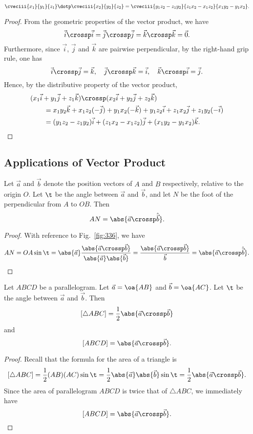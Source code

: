 \begin{proposition}
    \[\cveciii{x_1}{y_1}{z_1} \dotp \cveciii{x_2}{y_2}{z_2} = \cveciii{y_1 z_2 - z_1 y_2}{z_1 x_2 - x_1 z_2}{x_1 y_2 - y_1 x_2}.\]
\end{proposition}
\begin{proof}
    From the geometric properties of the vector product, we have \[\vec i \crossp \vec i = \vec j \crossp \vec j = \vec k \crossp \vec k = \vec 0.\] Furthermore, since $\vec i$, $\vec j$ and $\vec k$ are pairwise perpendicular, by the right-hand grip rule, one has \[\vec i \crossp \vec j = \vec k, \quad \vec j \crossp \vec k = \vec i, \quad \vec k \crossp \vec i = \vec j.\] Hence, by the distributive property of the vector product,
    \begin{align*}
        &(x_1 \vec i + y_1 \vec j + z_1 \vec k) \crossp (x_2 \vec i + y_2 \vec j + z_2 \vec k) \\
        &\hspace{2em}= x_1 y_2 \vec k + x_1 z_2 (-\vec j) + y_1 x_2 (-\vec k) + y_1 z_2 \vec i + z_1 x_2 \vec j + z_1 y_2 (-\vec i) \\
        &\hspace{2em}=(y_1 z_2 - z_1 y_2) \vec i + (z_1 x_2 - x_1 z_2) \vec j + (x_1 y_2 - y_1 x_2) \vec k.
    \end{align*}
\end{proof}

\subsection{Applications of Vector Product}

\begin{proposition}
    Let $\vec a$ and $\vec b$ denote the position vectors of $A$ and $B$ respectively, relative to the origin $O$. Let $\t$ be the angle between $\vec a$ and $\vec b$, and let $N$ be the foot of the perpendicular from $A$ to $OB$. Then \[AN = \abs{\vec a \crossp \hat{\vec b}}.\]
\end{proposition}
\begin{proof}
    With reference to Fig.~\ref{fig:336}, we have \[AN = OA \sin \t = \abs{\vec a} \frac{\abs{\vec a \crossp \vec b}}{\abs{\vec a}\abs{\vec b}} = \frac{\abs{\vec a \crossp \vec b}}{\vec b} = \abs{\vec a \crossp \hat{\vec b}}.\]
\end{proof}

\begin{proposition}
    Let $ABCD$ be a parallelogram. Let $\vec a = \oa{AB}$ and $\vec b = \oa{AC}$. Let $\t$ be the angle between $\vec a$ and $\vec b$. Then \[[\triangle ABC] = \frac12 \abs{\vec a \crossp \vec b}\] and \[[ABCD] = \abs{\vec a \crossp \vec b}.\]
\end{proposition}
\begin{proof}
    Recall that the formula for the area of a triangle is \[[\triangle ABC] = \frac12 (AB)(AC) \sin \t = \frac12 \abs{\vec a} \abs{\vec b} \sin \t = \frac12 \abs{\vec a \crossp \vec b}.\] Since the area of parallelogram $ABCD$ is twice that of $\triangle ABC$, we immediately have \[[ABCD] = \abs{\vec a \crossp \vec b}.\]
\end{proof}
